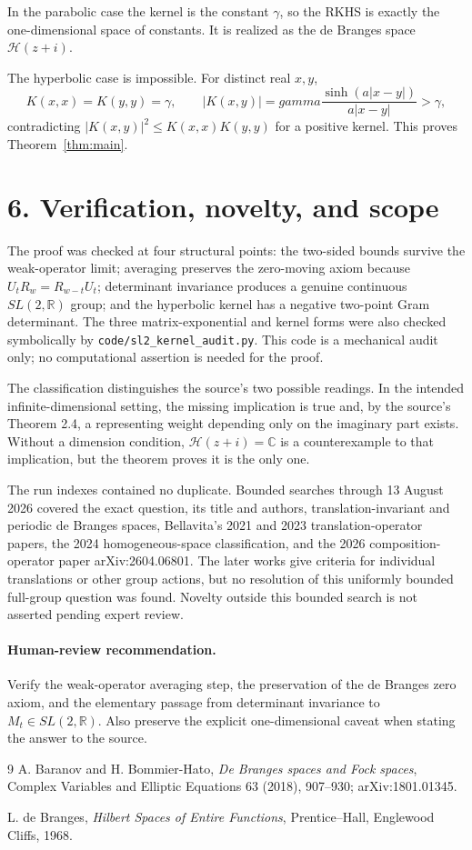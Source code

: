 \documentclass[11pt]{article}
\newcommand{\C}{\mathbb C}
\newcommand{\R}{\mathbb R}
\newcommand{\Hh}{\mathcal H}
\begin{document}
In the parabolic case the kernel is the constant $\gamma$, so the RKHS is
exactly the one-dimensional space of constants.  It is realized as the de
Branges space $\Hh(z+i)$.

The hyperbolic case is impossible.  For distinct real $x,y$,
\[
 K(x,x)=K(y,y)=\gamma,
 \qquad |K(x,y)|=gamma\frac{\sinh(a|x-y|)}{a|x-y|}>\gamma,
\]
contradicting $|K(x,y)|^2\leq K(x,x)K(y,y)$ for a positive kernel.
This proves Theorem~\ref{thm:main}.

\section*{6. Verification, novelty, and scope}

The proof was checked at four structural points: the two-sided bounds survive
the weak-operator limit; averaging preserves the zero-moving axiom because
$U_tR_w=R_{w-t}U_t$; determinant invariance produces a genuine continuous
$SL(2,\R)$ group; and the hyperbolic kernel has a negative two-point Gram
determinant.  The three matrix-exponential and kernel forms were also checked
symbolically by \texttt{code/sl2\_kernel\_audit.py}.  This code is a mechanical
audit only; no computational assertion is needed for the proof.

The classification distinguishes the source's two possible readings.  In the
intended infinite-dimensional setting, the missing implication is true and,
by the source's Theorem 2.4, a representing weight depending only on the
imaginary part exists.  Without a dimension condition, $\Hh(z+i)=\C$ is a
counterexample to that implication, but the theorem proves it is the only one.

The run indexes contained no duplicate.  Bounded searches through 13 August
2026 covered the exact question, its title and authors, translation-invariant
and periodic de Branges spaces, Bellavita's 2021 and 2023 translation-operator
papers, the 2024 homogeneous-space classification, and the 2026 composition-
operator paper arXiv:2604.06801.  The later works give criteria for individual
translations or other group actions, but no resolution of this uniformly
bounded full-group question was found.  Novelty outside this bounded search is
not asserted pending expert review.

\paragraph{Human-review recommendation.}
Verify the weak-operator averaging step, the preservation of the de Branges
zero axiom, and the elementary passage from determinant invariance to
$M_t\in SL(2,\R)$.  Also preserve the explicit one-dimensional caveat when
stating the answer to the source.

\begin{thebibliography}{9}
A. Baranov and H. Bommier-Hato,
\emph{De Branges spaces and Fock spaces},
Complex Variables and Elliptic Equations 63 (2018), 907--930;
arXiv:1801.01345.

L. de Branges,
\emph{Hilbert Spaces of Entire Functions},
Prentice--Hall, Englewood Cliffs, 1968.
\end{thebibliography}
\end{document}

